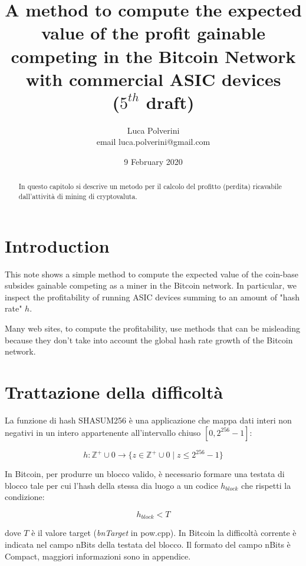 \documentclass{article}
\title{A method to compute the expected value of the profit gainable competing in the Bitcoin Network with commercial ASIC devices\\($5^{th}$ draft)}
\author{Luca Polverini \\ email luca.polverini@gmail.com}
\date{9 February 2020}
\begin{document}
\maketitle

\begin{abstract}
    In questo capitolo si descrive un metodo per il calcolo del profitto (perdita) ricavabile dall'attività di mining di cryptovaluta.
\end{abstract}

\tableofcontents

\section{Introduction}

This note shows a simple method to compute the expected value of the coin-base subsides gainable competing as a miner in the Bitcoin network.
In particular, we inspect the profitability of running ASIC devices summing to an amount of "hash rate" $h$.

Many web sites, to compute the profitability, use methods that can be misleading because they don't take into account the global hash rate growth of the Bitcoin network.

\section{Trattazione della difficoltà}

La funzione di hash SHASUM256 è una applicazione che mappa dati interi non negativi in un intero appartenente all'intervallo chiuso $ \left [0, 2^{256} - 1 \right ]$:

\begin{equation}
    h: \mathbb{Z}^{+} \cup {0} \rightarrow \{ z \in \mathbb{Z}^{+} \cup {0} \mid z  \leq 2^{256} - 1 \} \label{applicazione_hash}
\end{equation}

In Bitcoin, per produrre un blocco valido, è necessario formare una testata di blocco tale per cui l'hash della stessa dia luogo a un codice $h_{block}$ che rispetti la condizione:

\begin{equation}
    h_{block} < T \label{condizione_hash}
\end{equation}

dove $T$ è il valore target (\textit{bnTarget} in pow.cpp). In Bitcoin la difficoltà corrente è indicata nel campo nBits della testata del blocco.
Il formato del campo nBits è Compact, maggiori informazioni sono in appendice.
\end{document}
